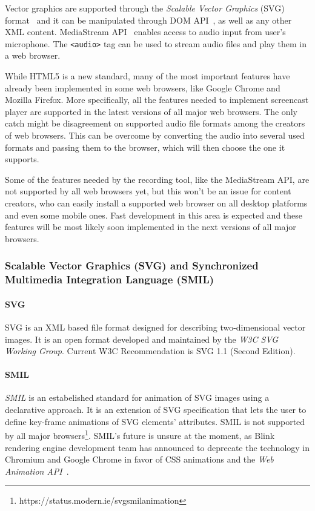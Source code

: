 Vector graphics are supported through the \textit{Scalable Vector Graphics} (SVG) format~\cite{svg} and it can be manipulated through DOM API~\cite{dom}, as well as any other XML content. MediaStream API~\cite{} enables access to audio input from user's microphone. The \verb|<audio>| tag can be used to stream audio files and play them in a web browser.

While HTML5 is a new standard, many of the most important features have already been implemented in some web browsers, like Google Chrome and Mozilla Firefox. More specifically, all the features needed to implement screencast player are supported in the latest versions of all major web browsers. The only catch might be disagreement on supported audio file formats among the creators of web browsers. This can be overcome by converting the audio into several used formats and passing them to the browser, which will then choose the one it supports.

Some of the features needed by the recording tool, like the MediaStream API, are not supported by all web browsers yet, but this won't be an issue for content creators, who can easily install a supported web browser on all desktop platforms and even some mobile ones. Fast development in this area is expected and these features will be most likely soon implemented in the next versions of all major browsers.

\subsubsection*{Scalable Vector Graphics (SVG) and Synchronized Multimedia Integration Language (SMIL)}
\paragraph{SVG} SVG is an XML based file format designed for describing two-dimensional vector images\cite{svg}. It is an open format developed and maintained by the \textit{W3C SVG Working Group}. Current W3C Recommendation is SVG 1.1 (Second Edition).

\paragraph{SMIL} \textit{SMIL} is an estabelished standard for animation of SVG images using a declarative approach. It is an extension of SVG specification that lets the user to define key-frame animations of SVG elements' attributes. SMIL is not supported by all major browsers\footnote{https://status.modern.ie/svgsmilanimation}. SMIL's future is unsure at the moment, as Blink rendering engine development team has announced to deprecate the technology in Chromium and Google Chrome in favor of CSS animations and the \textit{Web Animation API}~\cite{blink_no_smil}. 

